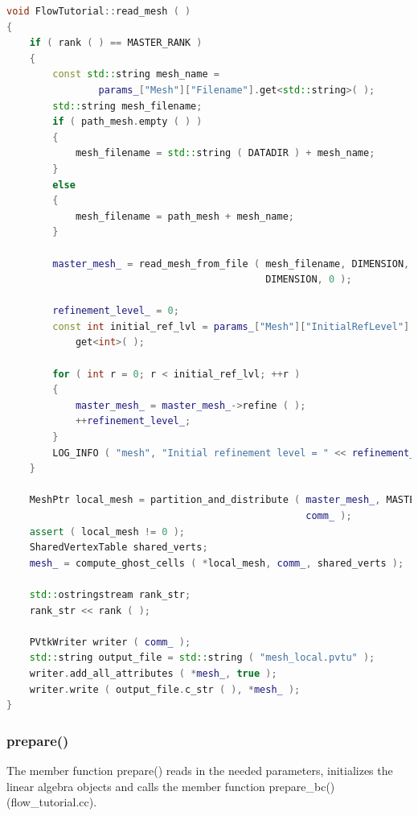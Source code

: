 \documentclass[a4paper, 11pt, twoside]{article}
\begin{document}
\begin{lstlisting}[language=C++, basicstyle={\footnotesize, \ttfamily}, keywordstyle=\color{blue},  numbers=none, tabsize=4]
void FlowTutorial::read_mesh ( )
{
    if ( rank ( ) == MASTER_RANK )
    {
        const std::string mesh_name =
                params_["Mesh"]["Filename"].get<std::string>( );
        std::string mesh_filename;
        if ( path_mesh.empty ( ) )
        {
            mesh_filename = std::string ( DATADIR ) + mesh_name;
        }
        else
        {
            mesh_filename = path_mesh + mesh_name;
        }

        master_mesh_ = read_mesh_from_file ( mesh_filename, DIMENSION, 
                                             DIMENSION, 0 );

        refinement_level_ = 0;
        const int initial_ref_lvl = params_["Mesh"]["InitialRefLevel"].
            get<int>( );

        for ( int r = 0; r < initial_ref_lvl; ++r )
        {
            master_mesh_ = master_mesh_->refine ( );
            ++refinement_level_;
        }
        LOG_INFO ( "mesh", "Initial refinement level = " << refinement_level_ );
    }

    MeshPtr local_mesh = partition_and_distribute ( master_mesh_, MASTER_RANK,
                                                    comm_ );
    assert ( local_mesh != 0 );
    SharedVertexTable shared_verts;
    mesh_ = compute_ghost_cells ( *local_mesh, comm_, shared_verts );

    std::ostringstream rank_str;
    rank_str << rank ( );

    PVtkWriter writer ( comm_ );
    std::string output_file = std::string ( "mesh_local.pvtu" );
    writer.add_all_attributes ( *mesh_, true );
    writer.write ( output_file.c_str ( ), *mesh_ );
}
\end{lstlisting}

\subsubsection{prepare()}\label{sec:prepare}
The member function prepare() reads in the needed parameters, initializes the linear algebra objects and calls the member function prepare\_bc() (flow\_tutorial.cc).
\end{document}
